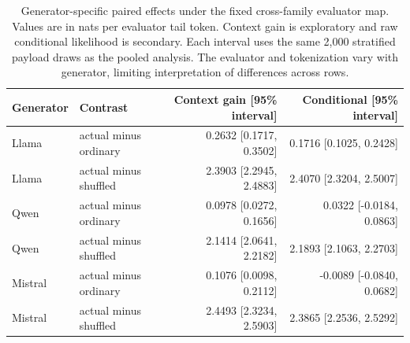 \begin{table}[H]\centering\small
\begin{tabular}{llrr}\toprule
Generator & Contrast & Context gain [95\% interval] & Conditional [95\% interval] \\ \midrule
Llama & actual minus ordinary & 0.2632 [0.1717, 0.3502] & 0.1716 [0.1025, 0.2428] \\
Llama & actual minus shuffled & 2.3903 [2.2945, 2.4883] & 2.4070 [2.3204, 2.5007] \\
Qwen & actual minus ordinary & 0.0978 [0.0272, 0.1656] & 0.0322 [-0.0184, 0.0863] \\
Qwen & actual minus shuffled & 2.1414 [2.0641, 2.2182] & 2.1893 [2.1063, 2.2703] \\
Mistral & actual minus ordinary & 0.1076 [0.0098, 0.2112] & -0.0089 [-0.0840, 0.0682] \\
Mistral & actual minus shuffled & 2.4493 [2.3234, 2.5903] & 2.3865 [2.2536, 2.5292] \\
\bottomrule\end{tabular}
\caption{Generator-specific paired effects under the fixed cross-family evaluator map. Values are in nats per evaluator tail token. Context gain is exploratory and raw conditional likelihood is secondary. Each interval uses the same 2,000 stratified payload draws as the pooled analysis. The evaluator and tokenization vary with generator, limiting interpretation of differences across rows.}\label{tab:v4-coherence-models}
\end{table}
